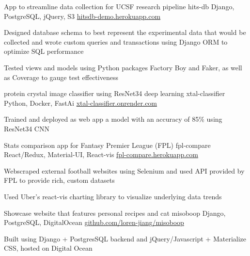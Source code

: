 \begin{cventries}
  \cventry
    {App to streamline data collection for UCSF research pipeline}
    {hits-db}
    {Django, PostgreSQL, jQuery, S3}
    {\href{https://hitsdb-demo.herokuapp.com}{hitsdb-demo.herokuapp.com}}
    {
      \begin{cvitems}
        \item {Designed database schema to best represent the experimental data that would be collected and wrote custom queries and transactions using Django ORM to optimize SQL performance}
        \item {Tested views and models using Python packages Factory Boy and Faker, as well as Coverage to gauge test effectiveness}
      \end{cvitems}
    }
  \cventry
    {protein crystal image classifier using ResNet34 deep learning}
    {xtal-classifier}
    {Python, Docker, FastAi}
    {\href{https://xtal-classifier.onrender.com/}{xtal-classifier.onrender.com}}
    {
      \begin{cvitems}
        \item Trained and deployed as web app a model with an accuracy of 85\% using ResNet34 CNN
      \end{cvitems}
    }
  \cventry
    {Stats comparison app for Fantasy Premier League (FPL)}
    {fpl-compare}
    {React/Redux, Material-UI, React-vis}
    {\href{https://fpl-compare.herokuapp.com}{fpl-compare.herokuapp.com}}
    {
      \begin{cvitems}
        \item {Webscraped external football websites using Selenium and used API provided by FPL to provide rich, custom datasets}
        \item {Used Uber’s react-vis charting library to visualize underlying data trends}
      \end{cvitems}
    }
  \cventry
    {Showcase website that features personal recipes and cat}
    {misoboop}
    {Django, PostgreSQL, DigitalOcean}
    {\href{https://github.com/loren-jiang/misoboop}{github.com/loren-jiang/misoboop}}
    {
      \begin{cvitems}
        \item Built using Django + PostgresSQL backend and jQuery/Javascript + Materialize CSS, hosted on Digital Ocean

\end{cvitems}}
\end{cventries}
